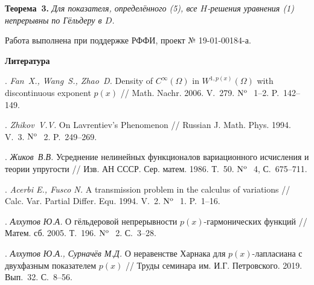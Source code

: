 \textbf{Теорема~3.} {\it Для показателя, определённого (5), все $H$-решения уравнения (1) непрерывны по Гёльдеру в $D$.}

\bigskip

Работа выполнена при поддержке РФФИ, проект № 19-01-00184-а.




\smallskip \centerline {\bf Литература} \nopagebreak

. {\it Fan~X., Wang~S., Zhao~D.} Density of $C^\infty(\Omega)$ in $W^{1,p(x)}(\Omega)$ with discontinuous exponent $p(x)$ // Math. Nachr. 2006. V.~279. ${\rm N^o}$\,~1--2. P.~142--149.

.  {\it Zhikov~V.V.} On Lavrentiev's Phenomenon // Russian J. Math. Phys. 1994. V.~3.  ${\rm N^o}$\,~2. P.~249--269.


. {\it Жиков~В.В.} Усреднение нелинейных функционалов вариационного исчисления и теории упругости // Изв. АН СССР.
Сер. матем. 1986. Т.~50. ${\rm N^o}$\,~4, С.~675--711.

. {\it Acerbi E., Fusco N.} A transmission problem in the calculus of variations // Calc. Var. Partial Differ. Equ. 1994. V.~2.  ${\rm N^o}$\,~1. P.~1--16.

. {\it Алхутов Ю.А.} О гёльдеровой непрерывности $p(x)$-гар\-мо\-ни\-ческих функций // Матем. сб. 2005. Т.~196. ${\rm N^o}$\,~2. С.~3--28.

. {\it Алхутов Ю.А., Сурначёв М.Д.} О неравенстве Харнака для $p(x)$-лапласиана с двухфазным показателем $p(x)$ // Труды семинара им. И.Г. Петровского. 2019. Вып.~32. С.~8--56.


